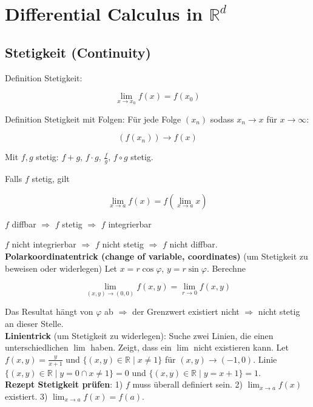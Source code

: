 \section{Differential Calculus in $\mathbb{R}^d$}

\subsection{Stetigkeit (Continuity)}

Definition Stetigkeit:

\[
    \lim_{x\rightarrow x_0} f(x) = f(x_0)
\]

Definition Stetigkeit mit Folgen: Für jede Folge $(x_n)$ sodass $x_n \rightarrow x$ für $x\rightarrow \infty $:

\[
    (f(x_n)) \rightarrow f(x)
\]

Mit $f,g$ stetig: $f+g$, $f\cdot g$, $\frac{f}{g}$, $f \circ g$ stetig.

Falls $f$ stetig, gilt

\[
    \lim_{x \rightarrow a} f(x) = f(\lim_{x\rightarrow a} x)
\]

$f$ diffbar $\Rightarrow$ $f$ stetig $\Rightarrow$ $f$ integrierbar

$f$ nicht integrierbar $\Rightarrow$ $f$ nicht stetig $\Rightarrow$ $f$ nicht diffbar.\\

\textbf{Polarkoordinatentrick (change of variable, coordinates)} (um Stetigkeit zu beweisen oder widerlegen) Let $x=r\cos \varphi$, $y=r\sin \varphi$. Berechne

\[
    \lim_{(x, y) \rightarrow (0,0)} f(x, y) = \lim_{r \rightarrow 0} f(x, y)
\]

Das Resultat hängt von $\varphi$ ab $\Rightarrow$ der Grenzwert existiert nicht $\Rightarrow$ nicht stetig an dieser Stelle.\\

\textbf{Linientrick} (um Stetigkeit zu widerlegen): Suche zwei Linien, die einen unterschiedlichen $\lim$ haben. Zeigt, dass ein $\lim$ nicht existieren kann.
Let $f(x, y)=\frac{y}{x+1}$ und $\{(x, y) \in \mathbb{R} \mid x \neq 1\}$ für $(x, y) \rightarrow (-1, 0)$. Linie $\{(x, y) \in \mathbb{R} \mid y=0\cap x \neq 1\}=0$ und $\{(x, y) \in \mathbb{R} \mid y=x+1\}=1$.\\

\textbf{Rezept Stetigkeit prüfen}: 1) $f$ muss überall definiert sein. 2) $\lim_{x \rightarrow a} f(x)$ existiert. 3) $\lim_{x \rightarrow a} f(x) = f(a)$.

